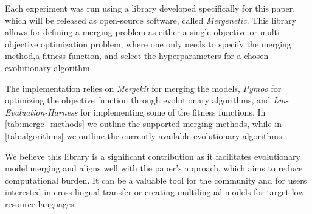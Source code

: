 \label{app:mergenetic}
Each experiment was run using a library developed specifically for this paper, which will be released as open-source software, called \textit{Mergenetic}. This library allows for defining a merging problem as either a single-objective or multi-objective optimization problem, where one only needs to specify the merging method,a fitness function, and select the hyperparameters for a chosen evolutionary algorithm. 

The implementation relies on \textit{Mergekit }  \cite{goddard2025arceesmergekittoolkitmerging} for merging the models, \textit{Pymoo } \cite{Blank_2020} for optimizing the objective function through evolutionary algorithms, and  \textit{Lm-Evaluation-Harness
 } \cite{eval-harness} for implementing some of the fitness functions. In \cref{tab:merge_methods} we outline the supported merging methods, while in \cref{tab:algorithms} we outline the currently available evolutionary algorithms.

We believe this library is a significant contribution as it facilitates evolutionary model merging and aligns well with the paper's approach, which aims to reduce computational burden. It can be a valuable tool for the community and for users interested in cross-lingual transfer or creating multilingual models for target low-resource languages.


\begin{table}
    \centering
    \caption{Overview of supported merging methods in Mergenetic.}
    \vspace{10pt}
    \label{tab:merge_methods}
\end{table}


